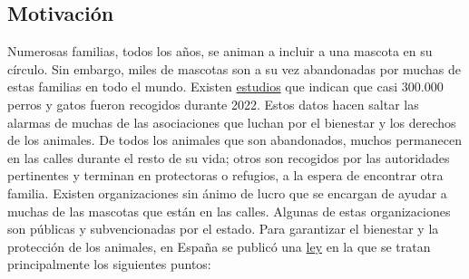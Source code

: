 \documentclass[a4paper, 12pt]{article}
\begin{document}
\subsection{Motivación}
Numerosas familias, todos los años, se animan a incluir a una mascota en su círculo. Sin embargo, miles de mascotas son a su vez abandonadas por muchas de estas familias en todo el mundo. Existen \href{https://www.fundacion-affinity.org/perros-gatos-y-personas/busco-un-animal-de-compania/las-cifras-del-abandono-de-perros-y-gatos-aun}{estudios} \cite{affinity} que indican que casi 300.000 perros y gatos fueron recogidos durante 2022. Estos datos hacen saltar las alarmas de muchas de las asociaciones que luchan por el bienestar y los derechos de los animales. De todos los animales que son abandonados, muchos permanecen en las calles durante el resto de su vida; otros son recogidos por las autoridades pertinentes y terminan en protectoras o refugios, a la espera de encontrar otra familia. Existen organizaciones sin ánimo de lucro que se encargan de ayudar a muchas de las mascotas que están en las calles. Algunas de estas organizaciones son públicas y subvencionadas por el estado. Para garantizar el bienestar y la protección de los animales, en España se publicó una \href{https://www.boe.es/buscar/doc.php?id=BOE-A-2023-7936}{ley} \cite{ley} en la que se tratan principalmente los siguientes puntos:
\end{document}
